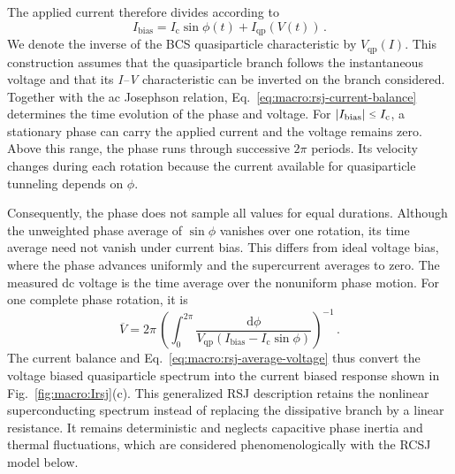             The applied current therefore divides according to
            \begin{equation}
                I_\mathrm{bias}
                = I_\mathrm{c}\sin\phi(t)
                + I_\mathrm{qp}\!\left(V(t)\right)\,.
                \label{eq:macro:rsj-current-balance}
            \end{equation}
            We denote the inverse of the BCS quasiparticle characteristic by $V_\mathrm{qp}(I)$. This construction assumes that the quasiparticle branch follows the instantaneous voltage and that its \textit{I--V} characteristic can be inverted on the branch considered. Together with the ac Josephson relation, Eq.~\eqref{eq:macro:rsj-current-balance} determines the time evolution of the phase and voltage. For $|I_\mathrm{bias}|\sleq{} I_\mathrm{c}$, a stationary phase can carry the applied current and the voltage remains zero. Above this range, the phase runs through successive $2\pi$ periods. Its velocity changes during each rotation because the current available for quasiparticle tunneling depends on $\phi$.
            
            Consequently, the phase does not sample all values for equal durations. Although the unweighted phase average of $\sin\phi$ vanishes over one rotation, its time average need not vanish under current bias. This differs from ideal voltage bias, where the phase advances uniformly and the supercurrent averages to zero. The measured dc voltage is the time average over the nonuniform phase motion. For one complete phase rotation, it is
            \begin{equation}
                \overline{V}
                = 2\pi\,\left(
                    \displaystyle\int_0^{2\pi}
                    \frac{\mathrm{d}\phi}{
                        V_\mathrm{qp}\!\left(I_\mathrm{bias}-I_\mathrm{c}\sin\phi\right)
                    }
                \right)^{-1}\,.
                \label{eq:macro:rsj-average-voltage}
            \end{equation}
            The current balance and Eq.~\eqref{eq:macro:rsj-average-voltage} thus convert the voltage biased quasiparticle spectrum into the current biased response shown in Fig.~\ref{fig:macro:Irsj}(c). This generalized RSJ description retains the nonlinear superconducting spectrum instead of replacing the dissipative branch by a linear resistance. It remains deterministic and neglects capacitive phase inertia and thermal fluctuations, which are considered phenomenologically with the RCSJ model below.

